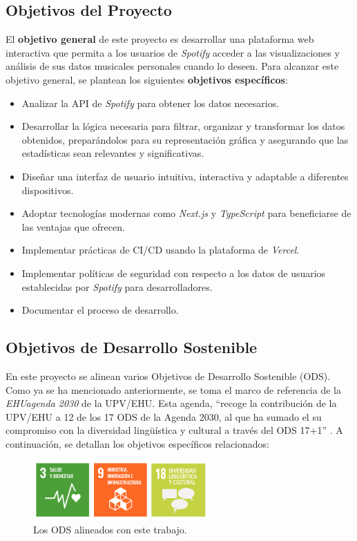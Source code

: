 \subsection{Objetivos del Proyecto}

El \textbf{objetivo general} de este proyecto es desarrollar una plataforma web interactiva que permita a los usuarios de \textit{Spotify} acceder a las visualizaciones y análisis de sus datos musicales personales cuando lo deseen. Para alcanzar este objetivo general, se plantean los siguientes \textbf{objetivos específicos}:

\begin{itemize}
    \item Analizar la API de \textit{Spotify} para obtener los datos necesarios.
    \item Desarrollar la lógica necesaria para filtrar, organizar y transformar los datos obtenidos, preparándolos para su representación gráfica y asegurando que las estadísticas sean relevantes y significativas.
    \item Diseñar una interfaz de usuario intuitiva, interactiva y adaptable a diferentes dispositivos.
    \item Adoptar tecnologías modernas como \textit{Next.js} y \textit{TypeScript} para beneficiarse de las ventajas que ofrecen.
    \item Implementar prácticas de CI/CD usando la plataforma de \textit{Vercel}.
    \item Implementar políticas de seguridad con respecto a los datos de usuarios establecidas por \textit{Spotify} para desarrolladores.
    \item Documentar el proceso de desarrollo.
\end{itemize}

\subsection{Objetivos de Desarrollo Sostenible}

En este proyecto se alinean varios Objetivos de Desarrollo Sostenible (ODS). Como ya se ha mencionado anteriormente, se toma el marco de referencia de la \textit{EHUagenda 2030} de la UPV/EHU. Esta agenda, ``recoge la contribución de la UPV/EHU a 12 de los 17 ODS de la Agenda 2030, al que ha sumado el su compromiso con la diversidad lingüística y cultural a través del ODS 17+1'' \cite{ehuagenda2030}. A continuación, se detallan los objetivos específicos relacionados:

\begin{figure}[h]
    \centering
    \includegraphics[width=0.6\textwidth]{figures/tres_ods_relacionadas.png}
    \caption{Los ODS alineados con este trabajo.}
    \label{fig:tres_ods}
\end{figure}


